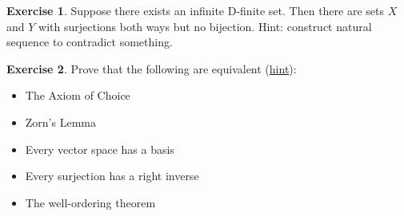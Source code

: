\documentclass{article}
\theoremstyle{definition}
\newtheorem{exer}{Exercise}[section]
\begin{document}
\begin{exer}
    Suppose there exists an infinite D-finite set. Then there are sets $X$ and $Y$ with surjections both ways but no bijection. Hint: construct natural sequence to contradict something.
\end{exer}

\begin{exer}
    Prove that the following are equivalent (\href{https://dept.math.lsa.umich.edu/~ablass/bases-AC.pdf}{hint}):
    \begin{itemize}
        \item The Axiom of Choice
        \item Zorn's Lemma
        \item Every vector space has a basis
        \item Every surjection has a right inverse
        \item The well-ordering theorem 
    \end{itemize}
\end{exer}
\end{document}
